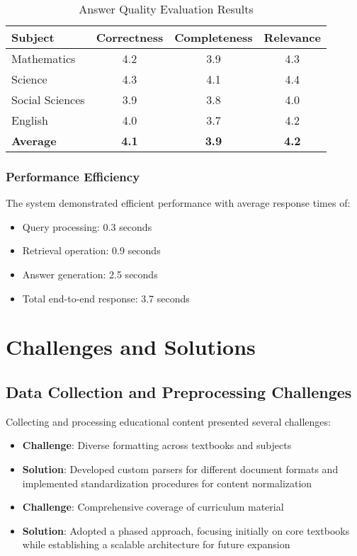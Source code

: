 \documentclass[10pt,conference]{IEEEtran}
\begin{document}
\begin{table}[h]
\centering
\caption{Answer Quality Evaluation Results}
\label{tab:quality}
\begin{tabular}{lccc}
\toprule
\textbf{Subject} & \textbf{Correctness} & \textbf{Completeness} & \textbf{Relevance} \\
\midrule
Mathematics & 4.2 & 3.9 & 4.3 \\
Science & 4.3 & 4.1 & 4.4 \\
Social Sciences & 3.9 & 3.8 & 4.0 \\
English & 4.0 & 3.7 & 4.2 \\
\midrule
\textbf{Average} & \textbf{4.1} & \textbf{3.9} & \textbf{4.2} \\
\bottomrule
\end{tabular}
\end{table}

\subsubsection{Performance Efficiency}
The system demonstrated efficient performance with average response times of:
\begin{itemize}
    \item Query processing: 0.3 seconds
    \item Retrieval operation: 0.9 seconds
    \item Answer generation: 2.5 seconds
    \item Total end-to-end response: 3.7 seconds
\end{itemize}


\section{Challenges and Solutions}
\subsection{Data Collection and Preprocessing Challenges}
Collecting and processing educational content presented several challenges:
\begin{itemize}
    \item \textbf{Challenge}: Diverse formatting across textbooks and subjects
    \item \textbf{Solution}: Developed custom parsers for different document formats and implemented standardization procedures for content normalization
    
    \item \textbf{Challenge}: Comprehensive coverage of curriculum material
    \item \textbf{Solution}: Adopted a phased approach, focusing initially on core textbooks while establishing a scalable architecture for future expansion
\end{itemize}
\end{document}
